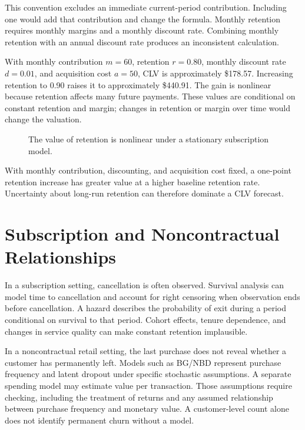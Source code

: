 This convention excludes an immediate current-period contribution.
Including one would add that contribution and change the formula.
Monthly retention requires monthly margins and a monthly discount rate.
Combining monthly retention with an annual discount rate produces an
inconsistent calculation.

With monthly contribution \(m=60\), retention \(r=0.80\), monthly
discount rate \(d=0.01\), and acquisition cost \(a=50\), CLV is
approximately \$178.57. Increasing retention to 0.90 raises it to
approximately \$440.91. The gain is nonlinear because retention affects
many future payments. These values are conditional on constant retention
and margin; changes in retention or margin over time would change the
valuation.

\begin{figure}[htbp]
\centering

\caption{The value of retention is nonlinear under a stationary subscription model.}\label{fig:M04_clv}
\end{figure}

With monthly contribution, discounting, and acquisition cost fixed, a
one-point retention increase has greater value at a higher baseline
retention rate. Uncertainty about long-run retention can therefore
dominate a CLV forecast.

\hypertarget{M04-subscription-and-noncontractual-relationships}{%
\section{Subscription and Noncontractual
Relationships}\label{M04-subscription-and-noncontractual-relationships}}

\noindent In a subscription setting, cancellation is often observed. Survival
analysis can model time to cancellation and account for right censoring
when observation ends before cancellation. A hazard describes the
probability of exit during a period conditional on survival to that
period. Cohort effects, tenure dependence, and changes in service
quality can make constant retention implausible.

In a noncontractual retail setting, the last purchase does not reveal
whether a customer has permanently left. Models such as BG/NBD represent
purchase frequency and latent dropout under specific stochastic
assumptions. A separate spending model may estimate value per
transaction. Those assumptions require checking, including the treatment
of returns and any assumed relationship between purchase frequency and
monetary value. A customer-level count alone does not identify permanent
churn without a model.

